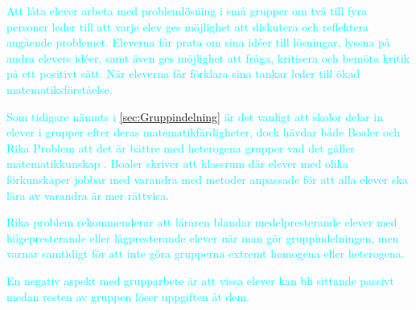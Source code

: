 \textcolor{cyan} {
Att låta elever arbeta med problemlösning i små grupper om två till fyra personer leder till att varje elev ges möjlighet att diskutera och reflektera angående problemet. Eleverna får prata om sina idéer till lösningar, lyssna på andra elevers idéer, samt även ges möjlighet att fråga, kritisera och bemöta kritik på ett positivt sätt. När eleverna får förklara sina tankar leder till ökad matematiksförståelse. \cite{RikaProblem}
}

\textcolor{cyan} {
Som tidigare nämnts i \ref{sec:Gruppindelning} är det vanligt att skolor delar in elever i grupper efter deras matematikfärdigheter, dock hävdar både Boaler och Rika Problem att det är bättre med heterogena grupper vad det gäller matematikkunskap \cite{TheElephant}\cite{RikaProblem}. Boaler skriver att klassrum där elever med olika förkunskaper jobbar med varandra med metoder anpassade för att alla elever ska lära av varandra är mer rättvisa\cite{TheElephant}. 
}

\textcolor{cyan} {
Rika problem rekommenderar att läraren blandar medelpresterande elever med högepresterande eller lågpresterande elever när man gör gruppindelningen, men varnar samtidigt för att inte göra grupperna extremt homogena eller heterogena\cite{RikaProblem}.
}




\textcolor{cyan} {
En negativ aspekt med grupparbete är att vissa elever kan bli sittande passivt medan resten av gruppen löser uppgiften åt dem. \cite{RikaProblem} %
}











